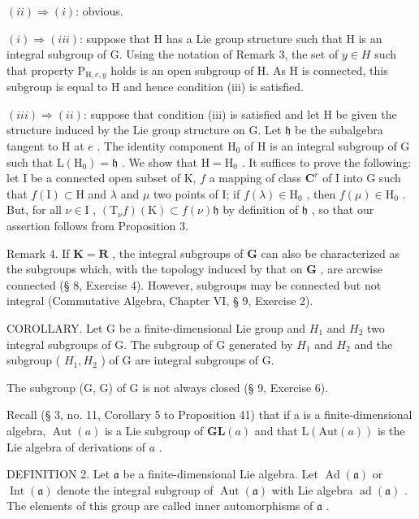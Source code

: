 \((ii) \Rightarrow (i)\): obvious.

\((i) \Rightarrow (iii)\): suppose that H has a Lie group structure such that H is an integral subgroup of G. Using the notation of Remark 3, the set of \(y \in H\) such that property \(\mathrm{P}_{\mathrm{H},e,y}\) holds is an open subgroup of H. As H is connected, this subgroup is equal to H and hence condition (iii) is satisfied.

\((iii) \Rightarrow (ii)\): suppose that condition (iii) is satisfied and let H be given the structure induced by the Lie group structure on G. Let \(\mathfrak{h}\) be the subalgebra tangent to H at \(e\) . The identity component \(\mathrm{H}_0\) of H is an integral subgroup of G such that \(\mathrm{L}(\mathrm{H}_0) = \mathfrak{h}\) . We show that \(\mathrm{H} = \mathrm{H}_0\) . It suffices to prove the following: let I be a connected open subset of K, \(f\) a mapping of class \(\mathbf{C}^r\) of I into G such that \(f(\mathrm{I}) \subset \mathrm{H}\) and \(\lambda\) and \(\mu\) two points of I; if \(f(\lambda) \in \mathrm{H}_0\) , then \(f(\mu) \in \mathrm{H}_0\) . But, for all \(\nu \in \mathrm{I}\) , \((\mathrm{T}_{\nu}f)(\mathrm{K}) \subset f(\nu)\mathfrak{h}\) by definition of \(\mathfrak{h}\) , so that our assertion follows from Proposition 3.

Remark 4. If \(\mathbf{K} = \mathbf{R}\) , the integral subgroups of \(\mathbf{G}\) can also be characterized as the subgroups which, with the topology induced by that on \(\mathbf{G}\) , are arcwise connected (§ 8, Exercise 4). However, subgroups may be connected but not integral (Commutative Algebra, Chapter VI, § 9, Exercise 2).

COROLLARY. Let G be a finite-dimensional Lie group and \(H_{1}\) and \(H_{2}\) two integral subgroups of G. The subgroup of G generated by \(H_{1}\) and \(H_{2}\) and the subgroup ( \(H_{1}, H_{2}\) ) of G are integral subgroups of G.

The subgroup (G, G) of G is not always closed (§ 9, Exercise 6).

Recall (§ 3, no. 11, Corollary 5 to Proposition 41) that if a is a finite-dimensional algebra, \(\operatorname{Aut}(a)\) is a Lie subgroup of \(\mathbf{GL}(a)\) and that \(\mathrm{L}(\mathrm{Aut}(a))\) is the Lie algebra of derivations of \(a\) .

DEFINITION 2. Let \(\mathfrak{a}\) be a finite-dimensional Lie algebra. Let \(\operatorname{Ad}(\mathfrak{a})\) or \(\operatorname{Int}(\mathfrak{a})\) denote the integral subgroup of \(\operatorname{Aut}(\mathfrak{a})\) with Lie algebra \(\operatorname{ad}(\mathfrak{a})\) . The elements of this group are called inner automorphisms of \(\mathfrak{a}\) .

